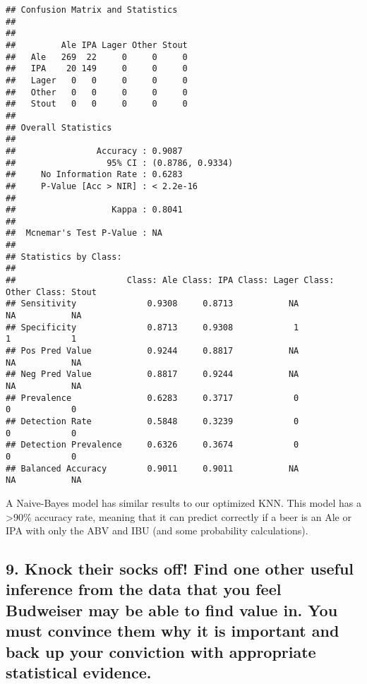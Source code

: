 \documentclass[
]{article}
\begin{document}
\begin{verbatim}
## Confusion Matrix and Statistics
## 
##        
##         Ale IPA Lager Other Stout
##   Ale   269  22     0     0     0
##   IPA    20 149     0     0     0
##   Lager   0   0     0     0     0
##   Other   0   0     0     0     0
##   Stout   0   0     0     0     0
## 
## Overall Statistics
##                                           
##                Accuracy : 0.9087          
##                  95% CI : (0.8786, 0.9334)
##     No Information Rate : 0.6283          
##     P-Value [Acc > NIR] : < 2.2e-16       
##                                           
##                   Kappa : 0.8041          
##                                           
##  Mcnemar's Test P-Value : NA              
## 
## Statistics by Class:
## 
##                      Class: Ale Class: IPA Class: Lager Class: Other Class: Stout
## Sensitivity              0.9308     0.8713           NA           NA           NA
## Specificity              0.8713     0.9308            1            1            1
## Pos Pred Value           0.9244     0.8817           NA           NA           NA
## Neg Pred Value           0.8817     0.9244           NA           NA           NA
## Prevalence               0.6283     0.3717            0            0            0
## Detection Rate           0.5848     0.3239            0            0            0
## Detection Prevalence     0.6326     0.3674            0            0            0
## Balanced Accuracy        0.9011     0.9011           NA           NA           NA
\end{verbatim}

A Naive-Bayes model has similar results to our optimized KNN. This model
has a \textgreater90\% accuracy rate, meaning that it can predict
correctly if a beer is an Ale or IPA with only the ABV and IBU (and some
probability calculations).

\hypertarget{knock-their-socks-off-find-one-other-useful-inference-from-the-data-that-you-feel-budweiser-may-be-able-to-find-value-in.-you-must-convince-them-why-it-is-important-and-back-up-your-conviction-with-appropriate-statistical-evidence.}{%
\subsection{9. Knock their socks off! Find one other useful inference
from the data that you feel Budweiser may be able to find value in. You
must convince them why it is important and back up your conviction with
appropriate statistical
evidence.}\label{knock-their-socks-off-find-one-other-useful-inference-from-the-data-that-you-feel-budweiser-may-be-able-to-find-value-in.-you-must-convince-them-why-it-is-important-and-back-up-your-conviction-with-appropriate-statistical-evidence.}}
\end{document}
